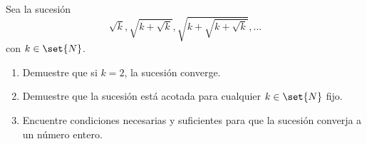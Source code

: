 \documentclass{ayudantia}
\begin{document}
\begin{prob}
    Sea la sucesión
    \begin{equation*}
        \sqrt{k},\sqrt{k+\sqrt{k}},\sqrt{k+\sqrt{k+\sqrt{k}}},\ldots
    \end{equation*}
    con \(k\in\set{N}\).
    \begin{enumerate}[label=(\alph*)]
        \item Demuestre que si \(k=2\), la sucesión converge.
        \item Demuestre que la sucesión está acotada para cualquier \(k\in\set{N}\) fijo.
        \item Encuentre condiciones necesarias y suficientes para que la sucesión converja a un número entero.
    \end{enumerate}
\end{prob}

\begin{ans}
    \begin{sol}

    \end{sol}
\end{ans}
\end{document}
